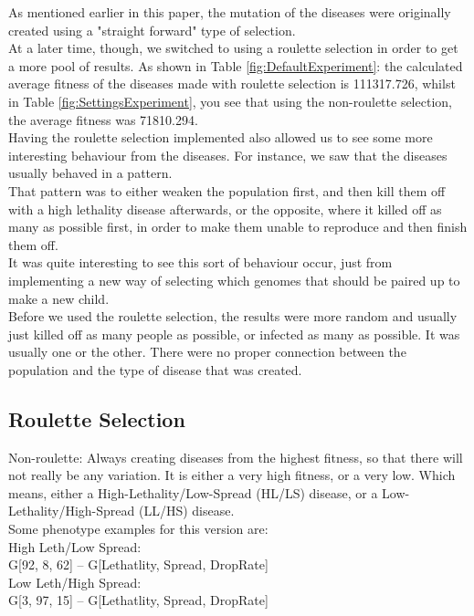 \documentclass[conference,compsoc]{IEEEtran}
\begin{document}
As mentioned earlier in this paper, the mutation of the diseases were originally created using a "straight forward" type of selection.\\
At a later time, though, we switched to using a roulette selection in order to get a more pool of results. As shown in Table \ref{fig:DefaultExperiment}: the calculated average fitness of the diseases made with roulette selection is 111317.726, whilst in Table \ref{fig:SettingsExperiment}, you see that using the non-roulette selection, the average fitness was 71810.294.\\
Having the roulette selection implemented also allowed us to see some more interesting behaviour from the diseases. For instance, we saw that the diseases usually behaved in a pattern.\\
That pattern was to either weaken the population first, and then kill them off with a high lethality disease afterwards, or the opposite, where it killed off as many as possible first, in order to make them unable to reproduce and then finish them off.\\

It was quite interesting to see this sort of behaviour occur, just from implementing a new way of selecting which genomes that should be paired up to make a new child.\\ 
Before we used the roulette selection, the results were more random and usually just killed off as many people as possible, or infected as many as possible. It was usually one or the other. There were no proper connection between the population and the type of disease that was created.\\

\subsection{Roulette Selection}
Non-roulette: Always creating diseases from the highest fitness, so that there will not really be any variation. It is either a very high fitness, or a very low. Which means, either a High-Lethality/Low-Spread (HL/LS) disease, or a Low-Lethality/High-Spread (LL/HS) disease.\\
Some phenotype examples for this version are:\\
High Leth/Low Spread:\\ 
G[92, 8, 62] -- G[Lethatlity, Spread, DropRate]\\
Low Leth/High Spread:\\ 
G[3, 97, 15] -- G[Lethatlity, Spread, DropRate]\\
\end{document}
